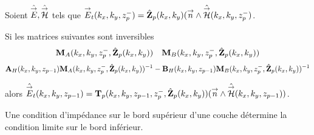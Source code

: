     \begin{prop}%
      \label{prop:plan:transfert:impedance}

      Soient \(\hat{{\overset{\rightarrow}{E}}},\hat{{\overset{\rightarrow}{\mathcal{H}}}}\) tels que \({\overset{\rightarrow}{E}}_t(k_x,k_y,z_p^-) = \hat{\mathbf{Z}}_{p}(k_x,k_y)({\overset{\rightarrow}{n}} \wedge \hat{{\overset{\rightarrow}{\mathcal{H}}}}(k_x,k_y,z_p^-)\).

      Si les matrices suivantes sont inversibles
      \begin{align*}
        \mathbf{M}_{A}(k_x,k_y,z_p^-, \hat{\mathbf{Z}}_{p}(k_x,k_y)) && \mathbf{M}_{B}(k_x,k_y,z_p^-, \hat{\mathbf{Z}}_{p}(k_x,k_y))
      \end{align*}
      \begin{align*}
        \mathbf{A}_{H}(k_x,k_y,z_{p-1})\mathbf{M}_{A}(k_x,k_y,z_p^-, \hat{\mathbf{Z}}_{p}(k_x,k_y))^{-1} - \mathbf{B}_{H}(k_x,k_y,z_{p-1})\mathbf{M}_{B}(k_x,k_y,z_p^-, \hat{\mathbf{Z}}_{p}(k_x,k_y))^{-1}
      \end{align*}

      alors \(\hat{{\overset{\rightarrow}{E}}}_t(k_x,k_y,z_{p-1}) = \mathbf{T}_p(k_x,k_y,z_{p-1},z_p^-,\hat{\mathbf{Z}}_{p}(k_x,k_y))({\overset{\rightarrow}{n}} \wedge \hat{{\overset{\rightarrow}{\mathcal{H}}}}(k_x,k_y,z_{p-1}))\).

      Une condition d'impédance sur le bord supérieur d'une couche détermine la condition limite sur le bord inférieur.
    \end{prop}


